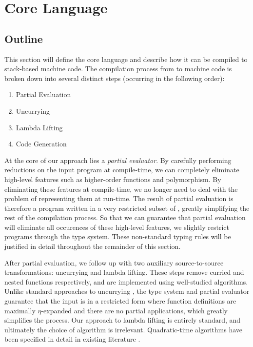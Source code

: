\documentclass[runningheads]{llncs}
\begin{document}
\section{Core Language}


\subsection{Outline}

This section will define the core language \core{} and describe how it can be compiled to stack-based machine code. The compilation process from \core{} to machine code is broken down into several distinct steps (occurring in the following order):

\begin{enumerate}
  \item Partial Evaluation
  \item Uncurrying
  \item Lambda Lifting
  \item Code Generation
\end{enumerate}

At the core of our approach lies a \emph{partial evaluator}. By carefully performing reductions on the input program at compile-time, we can completely eliminate high-level features such as higher-order functions and polymorphism. By eliminating these features at compile-time, we no longer need to deal with the problem of representing them at run-time. The result of partial evaluation is therefore a program written in a very restricted subset of \core{}, greatly simplifying the rest of the compilation process. So that we can guarantee that partial evaluation will eliminate all occurences of these high-level features, we slightly restrict \core{} programs through the type system. These non-standard typing rules will be justified in detail throughout the remainder of this section.

After partial evaluation, we follow up with two auxiliary source-to-source transformations: uncurrying and lambda lifting. These steps remove curried and nested functions respectively, and are implemented using well-studied algorithms. Unlike standard approaches to uncurrying \cite{hannan1998higher}, the type system and partial evaluator guarantee that the input is in a restricted form where function definitions are maximally $\eta$-expanded and there are no partial applications, which greatly simplifies the process. Our approach to lambda lifting is entirely standard, and ultimately the choice of algorithm is irrelevant. Quadratic-time algorithms have been specified in detail in existing literature \cite{morazan2008optimal}.
\end{document}
